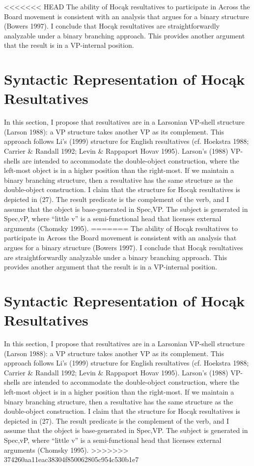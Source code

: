 \documentclass[output=paper]{LSP/langsci}
\begin{document}
\begin{exe}
\begin{exe}
\begin{exe}
\begin{exe}
{\begin{exe}
<<<<<<< HEAD
The ability of Hocąk resultatives to participate in Across the Board movement is consistent with an analysis that argues for a binary structure (Bowers 1997). I conclude that Hocąk resultatives are straightforwardly analyzable under a binary branching approach. This provides another argument that the result is in a VP-internal position.
 
\section{Syntactic Representation of Hocąk Resultatives}
 
In this section, I propose that resultatives are in a Larsonian VP-shell structure (Larson 1988): a VP structure takes another VP as its complement. This approach follows Li's (1999) structure for English resultatives (cf. Hoekstra 1988; Carrier \& Randall 1992; Levin \& Rappaport Hovav 1995). Larson's (1988) VP-shells are intended to accommodate the double-object construction, where the left-most object is in a higher position than the right-most. If we maintain a binary branching structure, then a resultative has the same structure as the double-object construction. I claim that the structure for Hocąk resultatives is depicted in (27). The result predicate is the complement of the verb, and I assume that the object is base-generated in Spec,VP. The subject is generated in Spec,vP, where ``little v'' is a semi-functional head that licenses external arguments (Chomsky 1995).
=======
The ability of Hoc\k{a}k resultatives to participate in Across the Board movement is consistent with an analysis that argues for a binary structure (Bowers 1997). I conclude that Hoc\k{a}k resultatives are straightforwardly analyzable under a binary branching approach. This provides another argument that the result is in a VP-internal position.
 
\section{Syntactic Representation of Hoc\k{a}k Resultatives}
 
In this section, I propose that resultatives are in a Larsonian VP-shell structure (Larson 1988): a VP structure takes another VP as its complement. This approach follows Li's (1999) structure for English resultatives (cf. Hoekstra 1988; Carrier \& Randall 1992; Levin \& Rappaport Hovav 1995). Larson's (1988) VP-shells are intended to accommodate the double-object construction, where the left-most object is in a higher position than the right-most. If we maintain a binary branching structure, then a resultative has the same structure as the double-object construction. I claim that the structure for Hoc\k{a}k resultatives is depicted in (27). The result predicate is the complement of the verb, and I assume that the object is base-generated in Spec,VP. The subject is generated in Spec,vP, where ``little v'' is a semi-functional head that licenses external arguments (Chomsky 1995).
>>>>>>> 374260aa11eac38304f850062805c954c530b1e7


\end{exe}}
\end{exe}
\end{exe}
\end{exe}
\end{exe}
\end{document}
